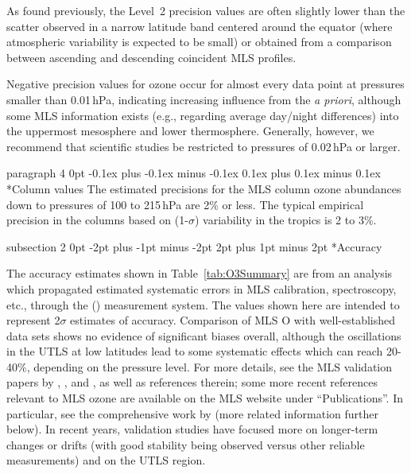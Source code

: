 \documentclass[11pt,draft]{report}
\makeatletter
\renewcommand{\subsection}{\@startsection%
  {subsection}%
  {2}%
  {0pt}%
  {-2pt plus -1pt minus -2pt}%
  {2pt plus 1pt minus 2pt}%
  {\large\sffamily\fontseries{sb}\selectfont\flushleft\color{SectionColor}\figureversion{tabular}}}%
\renewcommand{\paragraph}{\@startsection%
  {paragraph}%
  {4}%
  {0pt}%
  {-0.1ex plus -0.1ex minus -0.1ex}%
  {0.1ex plus 0.1ex minus 0.1ex}%
  {\normalsize\sffamily\flushleft\color{SectionColor}\figureversion{tabular}}}%
\makeatother
\begin{document}
As found previously, the Level~2 precision values are often slightly lower than 
the scatter observed in a narrow latitude band centered 
around the equator (where atmospheric variability is expected to be small) or
obtained from a comparison between ascending and descending coincident
MLS profiles.
 
Negative precision values for ozone occur for almost every data
point at pressures smaller than 0.01\,hPa, indicating increasing
influence from the \emph{a priori}, although some MLS information exists
(e.g., regarding average day/night differences) into the uppermost
mesosphere and lower thermosphere.  Generally, however, we recommend
that scientific studies be restricted to pressures of 0.02\,hPa or
larger.
 
\paragraph*{Column values} The estimated precisions for the \thisv MLS 
column ozone abundances down to pressures of 100 to 215\,hPa are 2\% or less.  
The typical empirical precision in the columns based on (1-$\sigma$)
variability in the tropics is 2 to 3\%.  
 
\subsection*{Accuracy}
 
The accuracy estimates shown in Table~\ref{tab:O3Summary} are from an
analysis which propagated estimated systematic errors in MLS
calibration, spectroscopy, etc., through the (\thisv) measurement system.  The 
values shown here are intended to represent 2$\sigma$ estimates of accuracy.  Comparison of MLS O with
well-established data sets shows no evidence of significant biases overall, although 
the oscillations in the UTLS at low latitudes lead to some systematic effects which can reach 20-40\%, depending on the pressure level. 
For more details, see the MLS validation papers by \citet{FroidevauxEtal08O3},
\citet{JiangYEtal07}, and \citet{LiveseyEtal08}, as well as references
therein; some more recent references relevant to MLS ozone are available
on the MLS website under ``Publications''.  In particular, see the comprehensive work by \citet{HubertEtal16} (more related information further below). In recent years, validation studies have focused more on longer-term changes or drifts (with good stability being observed versus other reliable measurements) and on the UTLS region.
 
\end{document}
